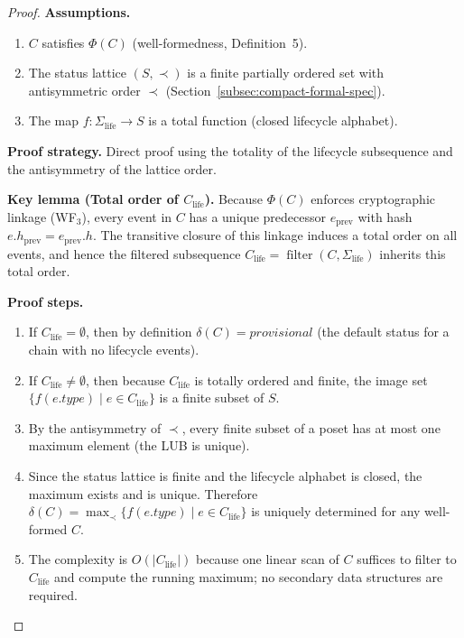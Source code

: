 \begin{proof}
\textbf{Assumptions.}
\begin{enumerate}[label=(A\arabic*),leftmargin=2em]
    \item $C$ satisfies $\Phi(C)$ (well-formedness, Definition~5).
    \item The status lattice $(S, \prec)$ is a finite partially ordered set with antisymmetric order $\prec$ (Section~\ref{subsec:compact-formal-spec}).
    \item The map $f: \Sigma_{\text{life}} \to S$ is a total function (closed lifecycle alphabet).
\end{enumerate}

\textbf{Proof strategy.} Direct proof using the totality of the lifecycle subsequence and the antisymmetry of the lattice order.

\textbf{Key lemma (Total order of $C_{\text{life}}$).} Because $\Phi(C)$ enforces cryptographic linkage (WF$_3$), every event in $C$ has a unique predecessor $e_{\text{prev}}$ with hash $e.h_{\text{prev}} = e_{\text{prev}}.h$. The transitive closure of this linkage induces a total order on all events, and hence the filtered subsequence $C_{\text{life}} = \operatorname{filter}(C, \Sigma_{\text{life}})$ inherits this total order.

\textbf{Proof steps.}
\begin{enumerate}[label=Step~\arabic*:,leftmargin=2em]
    \item If $C_{\text{life}} = \emptyset$, then by definition $\delta(C) = \textit{provisional}$ (the default status for a chain with no lifecycle events).
    \item If $C_{\text{life}} \neq \emptyset$, then because $C_{\text{life}}$ is totally ordered and finite, the image set $\{f(e.\textit{type}) \mid e \in C_{\text{life}}\}$ is a finite subset of $S$.
    \item By the antisymmetry of $\prec$, every finite subset of a poset has at most one maximum element (the LUB is unique).
    \item Since the status lattice is finite and the lifecycle alphabet is closed, the maximum exists and is unique. Therefore $\delta(C) = \max_{\prec}\{f(e.\textit{type}) \mid e \in C_{\text{life}}\}$ is uniquely determined for any well-formed $C$.
    \item The complexity is $O(|C_{\text{life}}|)$ because one linear scan of $C$ suffices to filter to $C_{\text{life}}$ and compute the running maximum; no secondary data structures are required.
\end{enumerate}
\end{proof}

